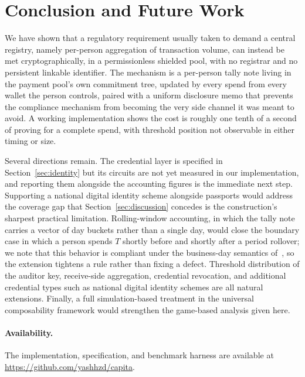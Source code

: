 \documentclass[11pt,a4paper]{article}
\theoremstyle{definition}
\theoremstyle{plain}
\theoremstyle{remark}
\begin{document}
\section{Conclusion and Future Work}

We have shown that a regulatory requirement usually taken to demand a central registry, namely per-person aggregation of transaction volume, can instead be met cryptographically, in a permissionless shielded pool, with no registrar and no persistent linkable identifier. The mechanism is a per-person tally note living in the payment pool's own commitment tree, updated by every spend from every wallet the person controls, paired with a uniform disclosure memo that prevents the compliance mechanism from becoming the very side channel it was meant to avoid. A working implementation shows the cost is roughly one tenth of a second of proving for a complete spend, with threshold position not observable in either timing or size.

Several directions remain. The credential layer is specified in Section~\ref{sec:identity} but its circuits are not yet measured in our implementation, and reporting them alongside the accounting figures is the immediate next step. Supporting a national digital identity scheme alongside passports would address the coverage gap that Section~\ref{sec:discussion} concedes is the construction's sharpest practical limitation. Rolling-window accounting, in which the tally note carries a vector of day buckets rather than a single day, would close the boundary case in which a person spends $T$ shortly before and shortly after a period rollover; we note that this behavior is compliant under the business-day semantics of~\cite{cfr1010313}, so the extension tightens a rule rather than fixing a defect. Threshold distribution of the auditor key, receive-side aggregation, credential revocation, and additional credential types such as national digital identity schemes are all natural extensions. Finally, a full simulation-based treatment in the universal composability framework would strengthen the game-based analysis given here.

\paragraph{Availability.}
The implementation, specification, and benchmark harness are available at \url{https://github.com/yashhzd/capita}.
\end{document}
